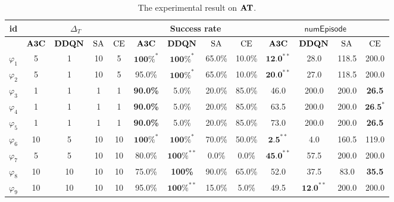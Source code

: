 \begin{table}[tp]
  \centering
    \centering
    \scriptsize
    \begin{tabular}[t]{c||c c c c|c c c c|c c c c|}
      id & \multicolumn{4}{|c|}{$\Delta_T$} & \multicolumn{4}{|c|}{Success rate} & \multicolumn{4}{|c|}{$\mathsf{numEpisode}$}\\
      \hline
      & $\mathbf{A3C}$ & $\mathbf{DDQN}$ & $\mathrm{SA}$ & $\mathrm{CE}$ & $\mathbf{A3C}$ & $\mathbf{DDQN}$ & $\mathrm{SA}$ & $\mathrm{CE}$ & $\mathbf{A3C}$ & $\mathbf{DDQN}$ & $\mathrm{SA}$ & $\mathrm{CE}$ \\
      \hline
      \hline
      $\varphi_1$ & 5 & 1 & 10 & 5 & $\textbf{100\%}^*$ & $\textbf{100\%}^*$ & 65.0\% & 10.0\% & $\textbf{12.0}^{**}$ & 28.0 & 118.5 & 200.0\\
      $\varphi_2$ & 5 & 1 & 10 & 5 & 95.0\% & $\textbf{100\%}^*$ & 65.0\% & 10.0\% & $\textbf{20.0}^{**}$ & 27.0 & 118.5 & 200.0\\
      $\varphi_3$ & 1 & 1 & 1 & 1 & \textbf{90.0\%} & 5.0\% & 20.0\% & 85.0\% & 46.0 & 200.0 & 200.0 & \textbf{26.5}\\
      $\varphi_4$ & 1 & 1 & 1 & 1 & \textbf{90.0\%} & 5.0\% & 20.0\% & 85.0\% & 63.5 & 200.0 & 200.0 & $\textbf{26.5}^*$\\
      $\varphi_5$ & 1 & 1 & 1 & 1 & \textbf{90.0\%} & 5.0\% & 20.0\% & 85.0\% & 73.0 & 200.0 & 200.0 & \textbf{26.5}\\
      $\varphi_6$ & 10 & 5 & 10 & 10 & $\textbf{100\%}^*$ & $\textbf{100\%}^*$ & 70.0\% & 50.0\% & $\textbf{2.5}^{**}$ & 4.0 & 160.5 & 119.0\\
      $\varphi_7$ & 5 & 5 & 10 & 10 & 80.0\% & $\textbf{100\%}^{**}$ & 0.0\% & 0.0\% & $\textbf{45.0}^{**}$ & 57.5 & 200.0 & 200.0\\
      $\varphi_8$ & 10 & 10 & 10 & 10 & 75.0\% & \textbf{100\%} & 90.0\% & 65.0\% & 52.0 & 37.5 & 83.0 & \textbf{35.5}\\
      $\varphi_9$ & 10 & 10 & 10 & 10 & 95.0\% & $\textbf{100\%}^{**}$ & 15.0\% & 5.0\% & 49.5 & $\textbf{12.0}^{**}$ & 200.0 & 200.0 \\
      \hline
  \end{tabular}
  \caption{The experimental result on $\mathbf{AT}$.}
  \label{tab:ARCH2014}
   \vspace{-5mm}
\end{table}



